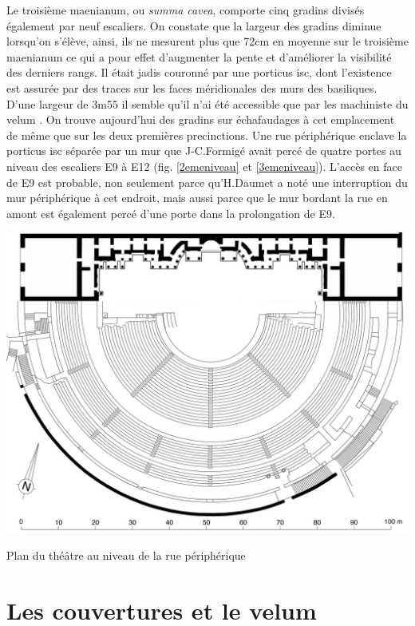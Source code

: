 		
		Le troisième \gls{maenianum}, ou \textit{summa cavea}, comporte cinq gradins divisés également par neuf escaliers. On constate que la largeur des gradins diminue lorsqu'on s'élève, ainsi, ils ne mesurent plus que 72cm en moyenne sur le troisième \gls{maenianum} ce qui a pour effet d'augmenter la pente et d'améliorer la visibilité des derniers rangs. Il était jadis couronné par une \gls{porticus isc}, dont l'existence est assurée par des traces sur les faces méridionales des murs des \glspl{basilique}. D'une largeur de 3m55 il semble qu'il n'ai été accessible que par les machiniste du \gls{velum} \cite{formige}. On trouve aujourd'hui des gradins sur échafaudages à cet emplacement de même que sur les deux premières \glspl{precinction}. Une rue périphérique enclave la \gls{porticus isc} séparée par un mur que J-C.Formigé avait percé de quatre portes au niveau des escaliers E9 à E12 (fig. \ref{2emeniveau} et \ref{3emeniveau}). L'accès en face de E9 est probable, non seulement parce qu'H.Daumet a noté une interruption du mur périphérique à cet endroit, mais aussi parce que le mur bordant la rue en amont est également percé d'une porte dans la prolongation de E9.


	\begin{figureth}
		\includegraphics[width=\linewidth]{images/3emeniveau}
		\caption[Vue de dessus - 3ème niveau]{Plan du théâtre au niveau de la rue périphérique \cite[Pl. XIX et XX fusionnées]{orangePl}}
		\label{3emeniveau}
	\end{figureth}	
		
		
\section{Les couvertures et le velum}
		
